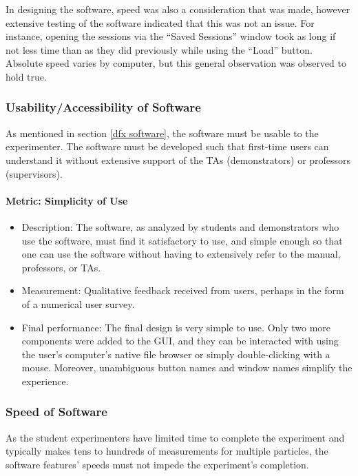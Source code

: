 \documentclass[12pt]{article} %
\begin{document}
In designing the software, speed was also a consideration that was made, however extensive testing of the software indicated that this was not an issue. For instance, opening the sessions via the ``Saved Sessions'' window took as long if not less time than as they did previously  while using the ``Load'' button. Absolute speed varies by computer, but this general observation was observed to hold true.

\subsubsection{Usability/Accessibility of Software}
As mentioned in section \ref{dfx software}, the software must be usable to the experimenter. The software must be developed such that first-time users can understand it without extensive support of the TAs (demonstrators) or professors (supervisors).

\paragraph{Metric: Simplicity of Use}
\begin{itemize}
    \item Description: The software, as analyzed by students and demonstrators who use the software, must find it satisfactory to use, and simple enough so that one can use the software without having to extensively refer to the manual, professors, or TAs. 
    \item Measurement: Qualitative feedback received from users, perhaps in the form of a numerical user survey.
    \item Final performance: The final design is very simple to use. Only two more components were added to the GUI, and they can be interacted with using the user's computer's native file browser or simply double-clicking with a mouse. Moreover, unambiguous button names and window names simplify the experience. 
\end{itemize}

\subsubsection{Speed of Software}
As the student experimenters have limited time to complete the experiment and typically makes tens to hundreds of measurements for multiple particles, the software features' speeds must not impede the experiment's completion.
\end{document}
